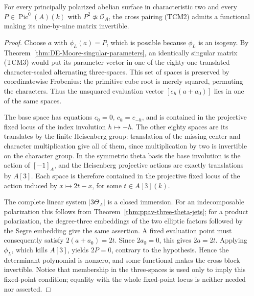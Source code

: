 \begin{theorem}
\label{thm:ppav-non-two-torsion-cross-Cartier}
For every principally polarized abelian surface in characteristic
two and every \(P\in\operatorname{Pic}^0(A)(k)\) with
\(P^2\not\simeq\mathcal O_A\), the cross pairing (TCM2) admits
a functional making its nine-by-nine matrix invertible.
\end{theorem}
\begin{proof}
Choose \(a\) with \(\phi_L(a)=P\), which is possible because
\(\phi_L\) is an isogeny.  By
Theorem~\ref{thm:DE-Moore-singular-parameters}, an identically singular
matrix (TCM3) would put its parameter vector in one of the eighty-one
translated character-scaled alternating three-spaces.
This set of spaces is preserved by coordinatewise Frobenius: the
primitive cube root is merely squared, permuting the characters.
Thus the unsquared evaluation vector \([e_h(a+a_0)]\) lies in
one of the same spaces.

The base space has equations \(c_0=0\), \(c_h=c_{-h}\), and is
contained in the projective fixed locus of the index involution
\(h\mapsto-h\).  The other eighty spaces are its translates by
the finite Heisenberg group: translation of the missing center and
character multiplication give all of them, since multiplication
by two is invertible on the character group.  In the symmetric
theta basis the base involution is the action of \([-1]_A\), and
the Heisenberg projective actions are exactly translations by
\(A[3]\).  Each space is therefore contained in the projective
fixed locus of the action induced by
\(x\mapsto2t-x\), for some \(t\in A[3](k)\).

The complete linear system \(|3\Theta_A|\) is a closed immersion.
For an indecomposable polarization this follows from
Theorem~\ref{thm:ppav-three-theta-jets}; for a product polarization,
the degree-three embeddings of the two elliptic factors followed
by the Segre embedding give the same assertion.  A fixed
evaluation point must consequently satisfy
\(2(a+a_0)=2t\).  Since \(2a_0=0\), this gives \(2a=2t\).
Applying \(\phi_L\), which kills \(A[3]\), yields
\(2P=0\), contrary to the hypothesis.  Hence the determinant
polynomial is nonzero, and some functional makes the cross block
invertible.  Notice that membership in the three-spaces is used
only to imply this fixed-point condition; equality with the whole
fixed-point locus is neither needed nor asserted.
\end{proof}

